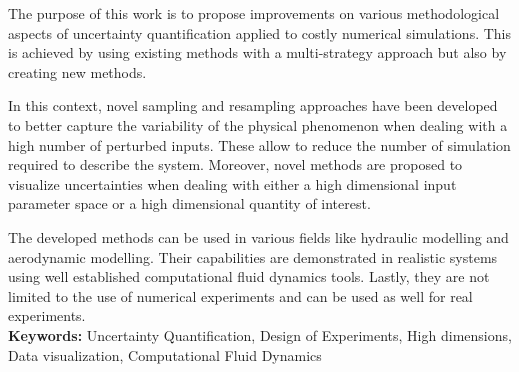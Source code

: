 The purpose of this work is to propose improvements on various methodological aspects of uncertainty quantification applied to costly numerical simulations. This is achieved by using existing methods with a multi-strategy approach but also by creating new methods. 

In this context, novel sampling and resampling approaches have been developed to better capture the variability of the physical phenomenon when dealing with a high number of perturbed inputs. These allow to reduce the number of simulation required to describe the system. Moreover, novel methods are proposed to visualize uncertainties when dealing with either a high dimensional input parameter space or a high dimensional quantity of interest.

The developed methods can be used in various fields like hydraulic modelling and aerodynamic modelling. Their capabilities are demonstrated in realistic systems using well established computational fluid dynamics tools. Lastly, they are not limited to the use of numerical experiments and can be used as well for real experiments.\\

\textbf{Keywords:} Uncertainty Quantification, Design of Experiments, High dimensions, Data visualization, Computational Fluid Dynamics %




